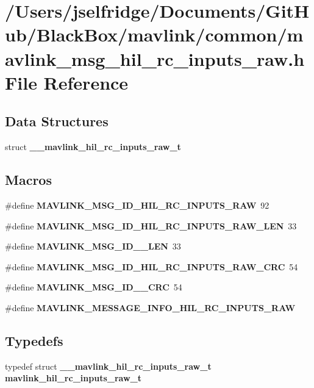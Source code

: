 \section{/\+Users/jselfridge/\+Documents/\+Git\+Hub/\+Black\+Box/mavlink/common/mavlink\+\_\+msg\+\_\+hil\+\_\+rc\+\_\+inputs\+\_\+raw.h File Reference}
\label{mavlink__msg__hil__rc__inputs__raw_8h}
\subsection*{Data Structures}
\begin{DoxyCompactItemize}
\item 
struct \textbf{ \+\_\+\+\_\+mavlink\+\_\+hil\+\_\+rc\+\_\+inputs\+\_\+raw\+\_\+t}
\end{DoxyCompactItemize}
\subsection*{Macros}
\begin{DoxyCompactItemize}
\item 
\#define \textbf{ M\+A\+V\+L\+I\+N\+K\+\_\+\+M\+S\+G\+\_\+\+I\+D\+\_\+\+H\+I\+L\+\_\+\+R\+C\+\_\+\+I\+N\+P\+U\+T\+S\+\_\+\+R\+AW}~92
\item 
\#define \textbf{ M\+A\+V\+L\+I\+N\+K\+\_\+\+M\+S\+G\+\_\+\+I\+D\+\_\+\+H\+I\+L\+\_\+\+R\+C\+\_\+\+I\+N\+P\+U\+T\+S\+\_\+\+R\+A\+W\+\_\+\+L\+EN}~33
\item 
\#define \textbf{ M\+A\+V\+L\+I\+N\+K\+\_\+\+M\+S\+G\+\_\+\+I\+D\+\_\+\_\+\+L\+EN}~33
\item 
\#define \textbf{ M\+A\+V\+L\+I\+N\+K\+\_\+\+M\+S\+G\+\_\+\+I\+D\+\_\+\+H\+I\+L\+\_\+\+R\+C\+\_\+\+I\+N\+P\+U\+T\+S\+\_\+\+R\+A\+W\+\_\+\+C\+RC}~54
\item 
\#define \textbf{ M\+A\+V\+L\+I\+N\+K\+\_\+\+M\+S\+G\+\_\+\+I\+D\+\_\+\_\+\+C\+RC}~54
\item 
\#define \textbf{ M\+A\+V\+L\+I\+N\+K\+\_\+\+M\+E\+S\+S\+A\+G\+E\+\_\+\+I\+N\+F\+O\+\_\+\+H\+I\+L\+\_\+\+R\+C\+\_\+\+I\+N\+P\+U\+T\+S\+\_\+\+R\+AW}
\end{DoxyCompactItemize}
\subsection*{Typedefs}
\begin{DoxyCompactItemize}
\item 
typedef struct \textbf{ \+\_\+\+\_\+mavlink\+\_\+hil\+\_\+rc\+\_\+inputs\+\_\+raw\+\_\+t} \textbf{ mavlink\+\_\+hil\+\_\+rc\+\_\+inputs\+\_\+raw\+\_\+t}
\end{DoxyCompactItemize}


